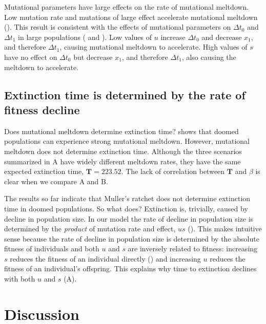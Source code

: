 \documentclass[9pt,lineno]{elife}
\begin{document}
Mutational parameters have large effects on the rate of mutational meltdown.  Low mutation rate and mutations of large effect accelerate mutational meltdown ().  This result is consistent with the effects of mutational parameters on $\Delta t_0$ and $\Delta t_1$ in large populations ( and ).  
%
Low values of $u$ increase $\Delta t_0$  and decrease $x_1$, and therefore $\Delta t_1$, causing mutational meltdown to accelerate.  
%
High values of $s$ have no effect on $\Delta t_0$ but decrease $x_1$, and therefore $\Delta t_1$, also causing the meltdown to accelerate.


\subsection{Extinction time is determined by the rate of fitness decline}


Does mutational meltdown determine extinction time? 
%
 shows that doomed populations can experience strong mutational meltdown.  However, mutational meltdown does not determine extinction time.  Although the three scenarios summarized in A have widely different meltdown rates, they have the same expected extinction time, $\mathbf{T} = 223.52$.  The lack of correlation between $\mathbf{T}$ and $\beta$ is clear when we compare A and B.

The results so far indicate that Muller's ratchet does not determine extinction time in doomed populations.  So what does?
%
Extinction is, trivially, caused by decline in population size.  In our model the rate of decline in population size is determined by the \textit{product} of mutation rate and effect, $us$ ().  This makes intuitive sense because the rate of decline in population size is determined by the absolute fitness of individuals and both $u$ and $s$ are inversely related to fitness: 
increasing $s$ reduces the fitness of an individual directly () and increasing $u$ reduces the fitness of an individual's offspring.
%
This explains why time to extinction declines with both $u$ and $s$ (A).




\section{Discussion}
\end{document}
